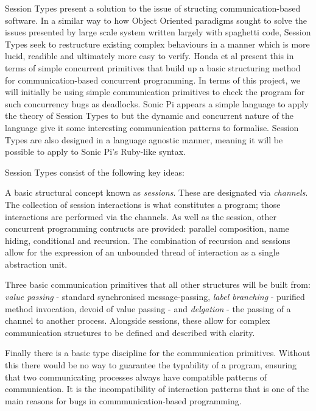 \documentclass[11pt]{scrartcl}
\begin{document}
Session Types present a solution to the issue of structing communication-based 
software. In a similar way to how Object Oriented paradigms sought to solve 
the issues presented by large scale system written largely with spaghetti 
code, Session Types seek to restructure existing complex behaviours in a 
manner which is more lucid, readible and ultimately more easy to verify. Honda 
et al \cite{HVM98} present this in terms of simple concurrent primitives that 
build up a basic structuring method for communication-based concurrent 
programming. In terms of this project, we will initially be using simple 
communication primitives to check the program for such concurrency bugs as 
deadlocks. Sonic Pi appears a simple language to apply the theory of Session 
Types to but the dynamic and concurrent nature of the language give it some 
interesting communication patterns to formalise. Session Types 
are also designed in a language agnostic manner, meaning it will be possible to 
apply to Sonic Pi's Ruby-like syntax.

Session Types consist of the following key ideas:

A basic structural concept known as \emph{sessions}. These are designated via 
\emph{channels}. The collection of session interactions is what constitutes a 
program; those interactions are performed via the channels. As well as the 
session, other concurrent programming contructs are provided: parallel 
composition, name hiding, conditional and recursion. The combination of 
recursion and sessions allow for the expression of an unbounded thread of 
interaction as a single abstraction unit.

Three basic communication primitives that all other structures will be built 
from: \emph{value passing} - standard synchronised message-passing, \emph{
label branching} - purified method invocation, devoid of value passing - and 
\emph{delgation} - the passing of a channel to another process. Alongside 
sessions, these allow for complex communication structures to be defined and 
described with clarity.

Finally there is a basic type discipline for the communication primitives. 
Without this there would be no way to guarantee the typability of a program, 
ensuring that two communicating processes always have compatible patterns of 
communication. It is the incompatibility of interaction patterns that is one 
of the main reasons for bugs in commmunication-based programming.
\end{document}
